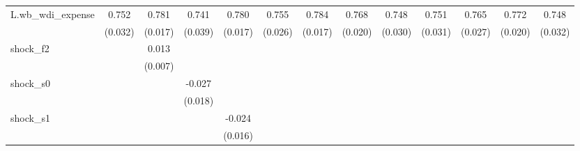 {\begin{tabular}{l*{12}{c}}
\addlinespace
L.wb\_wdi\_expense&       0.752\sym{***}&       0.781\sym{***}&       0.741\sym{***}&       0.780\sym{***}&       0.755\sym{***}&       0.784\sym{***}&       0.768\sym{***}&       0.748\sym{***}&       0.751\sym{***}&       0.765\sym{***}&       0.772\sym{***}&       0.748\sym{***}\\
            &     (0.032)         &     (0.017)         &     (0.039)         &     (0.017)         &     (0.026)         &     (0.017)         &     (0.020)         &     (0.030)         &     (0.031)         &     (0.027)         &     (0.020)         &     (0.032)         \\
\addlinespace
shock\_f2    &                     &       0.013\sym{*}  &                     &                     &                     &                     &                     &                     &                     &                     &                     &                     \\
            &                     &     (0.007)         &                     &                     &                     &                     &                     &                     &                     &                     &                     &                     \\
\addlinespace
shock\_s0    &                     &                     &      -0.027         &                     &                     &                     &                     &                     &                     &                     &                     &                     \\
            &                     &                     &     (0.018)         &                     &                     &                     &                     &                     &                     &                     &                     &                     \\
\addlinespace
shock\_s1    &                     &                     &                     &      -0.024         &                     &                     &                     &                     &                     &                     &                     &                     \\
            &                     &                     &                     &     (0.016)         &                     &                     &                     &                     &                     &                     &                     &                     \\

\end{tabular}}

